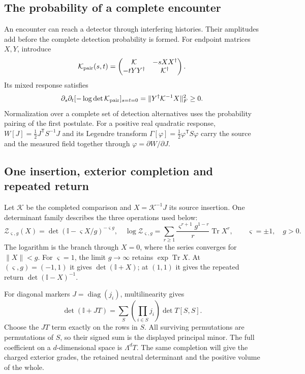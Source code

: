 \documentclass[aps,prx,onecolumn,10pt,notitlepage,nofootinbib,longbibliography]{revtex4-2}
\numberwithin{equation}{section}
\numberwithin{table}{section}
\newcommand{\Id}{\mathbb I}
\newcommand{\Tr}{\operatorname{Tr}}
\newcommand{\diag}{\operatorname{diag}}
\begin{document}
\subsection{The probability of a complete encounter}
An encounter can reach a detector through interfering histories. Their amplitudes add before the complete detection probability is formed. For endpoint matrices $X,Y$, introduce
\begin{equation}
 \mathcal K_{\rm pair}(s,t)=\begin{pmatrix}{\mathcal K}&-sXX^\dagger\\-tYY^\dagger&{\mathcal K}^\dagger\end{pmatrix}.
\end{equation}
Its mixed response satisfies
\begin{equation}
 \partial_s\partial_t[-\log\det\mathcal K_{\rm pair}]_{s=t=0}
 =\|Y^\dagger {\mathcal K}^{-1}X\|_F^2\geq0.
\end{equation}
Normalization over a complete set of detection alternatives uses the probability pairing of the first postulate. For a positive real quadratic response, $W[J]=\tfrac12J^{\mathsf T}S^{-1}J$ and its Legendre transform $\Gamma[\varphi]=\tfrac12\varphi^{\mathsf T}S\varphi$ carry the source and the measured field together through $\varphi=\partial W/\partial J$.

\subsection{One insertion, exterior completion and repeated return}
Let ${\mathcal K}$ be the completed comparison and $X={\mathcal K}^{-1}J$ its source insertion.
One determinant family describes the three operations used below:
\begin{equation}
 \mathcal Z_{\varsigma,g}(X)=\det(\Id-\varsigma X/g)^{-\varsigma g},
 \quad
 \log\mathcal Z_{\varsigma,g}
 =\sum_{r\geq1}\frac{\varsigma^{r+1}g^{1-r}}{r}\Tr X^r,
 \qquad \varsigma=\pm1,\quad g>0.
 \label{eq:sourceoperations}
\end{equation}
The logarithm is the branch through $X=0$, where the series converges for
$\|X\|<g$. For $\varsigma=1$, the limit $g\to\infty$ retains
$\exp\Tr X$. At $(\varsigma,g)=(-1,1)$ it gives $\det(\Id+X)$;
at $(1,1)$ it gives the repeated return $\det(\Id-X)^{-1}$.

For diagonal markers $J=\diag(j_i)$, multilinearity gives
\begin{equation}
 \det(\Id+JT)=\sum_S\left(\prod_{i\in S}j_i\right)\det T[S,S].
 \label{eq:exteriorsource}
\end{equation}
Choose the $JT$ term exactly on the rows in $S$. All surviving permutations
are permutations of $S$, so their signed sum is the displayed principal minor.
The full coefficient on a $d$-dimensional space is $\Lambda^dT$. The same
completion will give the charged exterior grades, the retained neutral
determinant and the positive volume of the whole.
\end{document}
